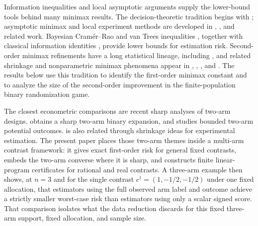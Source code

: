 Information inequalities and local asymptotic arguments supply the lower-bound tools behind many minimax results. The decision-theoretic tradition begins with \citet{wald_1950}; asymptotic minimax and local experiment methods are developed in \citet{lecam_1986}, \citet{ibragimov_1981}, and related work. Bayesian Cramér--Rao and van Trees inequalities \citep{van_trees_1968,gill_1995}, together with classical information identities \citep{rao_1945}, provide lower bounds for estimation risk. Second-order minimax refinements have a long statistical lineage, including \citet{levit_1981_second_order}, and related shrinkage and nonparametric minimax phenomena appear in \citet{bickel_1981}, \citet{pinsker_1980}, \citet{feldman_1991}, and \citet{johnstone_1992}. The results below use this tradition to identify the first-order minimax constant and to analyze the size of the second-order improvement in the finite-population binary randomization game.

The closest econometric comparisons are recent sharp analyses of two-arm designs. \citet{sudijono_dobriban_tchetgen_2026_sharp} obtains a sharp two-arm binary expansion, and \citet{hull_2026_bounded} studies bounded two-arm potential outcomes. \citet{rosenman_hunter_2026_shrinkage} is also related through shrinkage ideas for experimental estimation. The present paper places those two-arm themes inside a multi-arm contrast framework: it gives exact first-order risk for general fixed contrasts, embeds the two-arm converse where it is sharp, and constructs finite linear-program certificates for rational and real contrasts. A three-arm example then shows, at \(n=3\) and for the single contrast \(c^\dagger=(1,-1/2,-1/2)\) under one fixed allocation, that estimators using the full observed arm label and outcome achieve a strictly smaller worst-case risk than estimators using only a scalar signed score. That comparison isolates what the data reduction discards for this fixed three-arm support, fixed allocation, and sample size.
